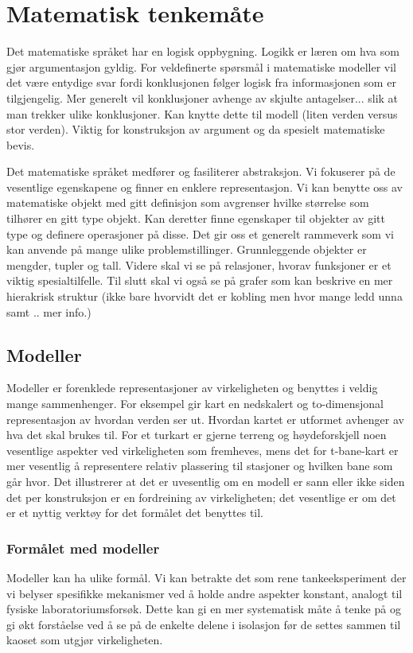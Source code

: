 \chapter{Matematisk tenkemåte}
Det matematiske språket har en logisk oppbygning. Logikk er læren om hva som gjør argumentasjon gyldig. For veldefinerte spørsmål i matematiske modeller vil det være entydige svar fordi konklusjonen følger logisk fra informasjonen som er tilgjengelig. Mer generelt vil konklusjoner avhenge av skjulte antagelser... slik at man trekker ulike konklusjoner. Kan knytte dette til modell (liten verden versus stor verden). Viktig for konstruksjon av argument og da spesielt matematiske bevis. 

Det matematiske språket medfører og fasiliterer abstraksjon. Vi fokuserer på de vesentlige egenskapene og finner en enklere representasjon. Vi kan benytte oss av matematiske objekt med gitt definisjon som avgrenser hvilke størrelse som tilhører en gitt type objekt. Kan deretter finne egenskaper til objekter av gitt type og definere operasjoner på disse. Det gir oss et generelt rammeverk som vi kan anvende på mange ulike problemstillinger. Grunnleggende objekter er mengder, tupler og tall. Videre skal vi se på relasjoner, hvorav funksjoner er et viktig spesialtilfelle. Til slutt skal vi også se på grafer som kan beskrive en mer hierakrisk struktur (ikke bare hvorvidt det er kobling men hvor mange ledd unna samt .. mer info.)
\section{Modeller}
Modeller er forenklede representasjoner av virkeligheten og benyttes i veldig mange sammenhenger. For eksempel gir kart en nedskalert og to-dimensjonal representasjon av hvordan verden ser ut. Hvordan kartet er utformet avhenger av hva det skal brukes til. For et turkart er gjerne terreng og høydeforskjell noen vesentlige aspekter ved virkeligheten som fremheves, mens det for t-bane-kart er mer vesentlig å representere relativ plassering til stasjoner og hvilken bane som går hvor. Det illustrerer at det er uvesentlig om en modell er sann eller ikke siden det per konstruksjon er en fordreining av virkeligheten; det vesentlige er om det er et nyttig verktøy for det formålet det benyttes til. 
\subsection{Formålet med modeller}
Modeller kan ha ulike formål. Vi kan betrakte det som rene tankeeksperiment der vi belyser spesifikke mekanismer ved å holde andre aspekter konstant, analogt til fysiske laboratoriumsforsøk. Dette kan gi en mer systematisk måte å tenke på og gi økt forståelse ved å se på de enkelte delene i isolasjon før de settes sammen til kaoset som utgjør virkeligheten.

